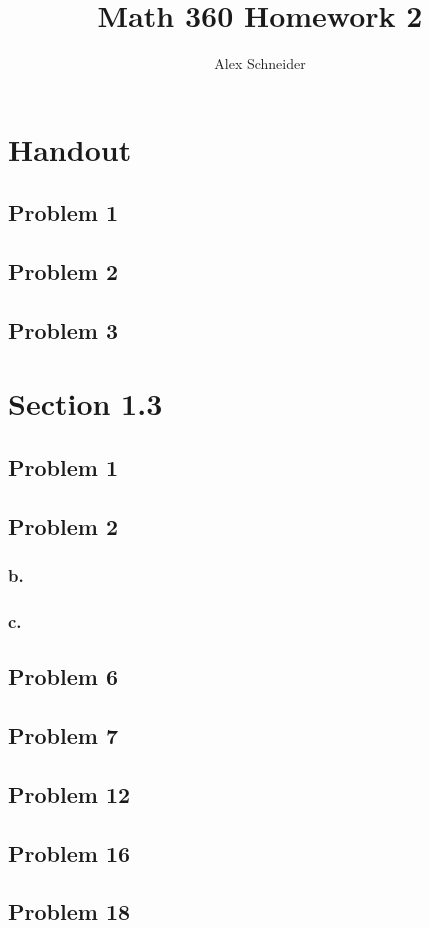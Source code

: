 \documentclass[11pt]{article}
\title{Math 360 Homework 2}
\author{Alex Schneider}
\begin{document}
\maketitle
\section*{Handout}
\subsection*{Problem 1}
\subsection*{Problem 2}
\subsection*{Problem 3}

\section*{Section 1.3}
\subsection*{Problem 1}
\subsection*{Problem 2}
\subsubsection*{b.}
\subsubsection*{c.}
\subsection*{Problem 6}
\subsection*{Problem 7}
\subsection*{Problem 12}
\subsection*{Problem 16}
\subsection*{Problem 18}
\end{document}

